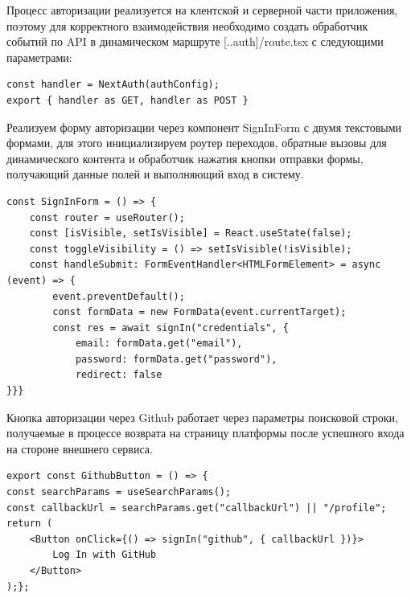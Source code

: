 \documentclass[master, och, diploma]{SCWorks}
\begin{document}
Процесс авторизации реализуется на клентской и серверной части приложения, поэтому для корректного взаимодействия необходимо создать обработчик событий по API в динамическом маршруте [..auth]/route.tsx с следующими параметрами:
\begin{verbatim}
const handler = NextAuth(authConfig);
export { handler as GET, handler as POST }
\end{verbatim}

Реализуем форму авторизации через компонент SignInForm с двумя текстовыми формами, для этого инициализируем роутер переходов, обратные вызовы для динамического контента и обработчик нажатия кнопки отправки формы, получающий данные полей и выполняющий вход в систему.
\begin{verbatim}
const SignInForm = () => {
    const router = useRouter();
    const [isVisible, setIsVisible] = React.useState(false);
    const toggleVisibility = () => setIsVisible(!isVisible);
    const handleSubmit: FormEventHandler<HTMLFormElement> = async (event) => {
        event.preventDefault();
        const formData = new FormData(event.currentTarget);
        const res = await signIn("credentials", {
            email: formData.get("email"),
            password: formData.get("password"),
            redirect: false
}}}
\end{verbatim}

Кнопка авторизации через Github работает через параметры поисковой строки, получаемые в процессе возврата на страницу платформы после успешного входа на стороне внешнего сервиса.
\begin{verbatim}
export const GithubButton = () => {
const searchParams = useSearchParams();
const callbackUrl = searchParams.get("callbackUrl") || "/profile";
return (
    <Button onClick={() => signIn("github", { callbackUrl })}>        
        Log In with GitHub
    </Button>
);};
\end{verbatim}
\end{document}
